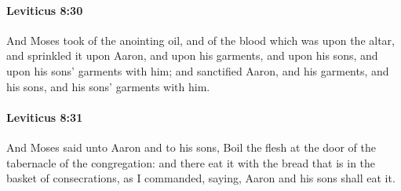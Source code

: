 		\paragraph{Leviticus 8:30} %
			\label{LEVITICUS-8-30}

			And Moses took of the anointing oil, and of the blood which was upon the altar, and sprinkled it upon Aaron, and upon his garments, and upon his sons, and upon his sons’ garments with him; and sanctified Aaron, and his garments, and his sons, and his sons’ garments with him.


		\paragraph{Leviticus 8:31} %
			\label{LEVITICUS-8-31}

			And Moses said unto Aaron and to his sons, Boil the flesh at the door of the tabernacle of the congregation: and there eat it with the bread that is in the basket of consecrations, as I commanded, saying, Aaron and his sons shall eat it.


